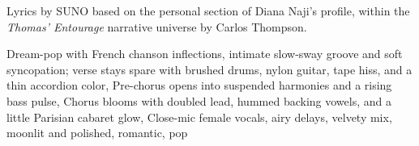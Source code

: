 
\begin{notes}
Lyrics by SUNO based on the personal section of Diana Naji's profile, within the \emph{Thomas’ Entourage} narrative universe by Carlos Thompson.
\end{notes}
\begin{style}
Dream-pop with French chanson inflections, intimate slow-sway groove and soft syncopation; verse stays spare with brushed drums, nylon guitar, tape hiss, and a thin accordion color, Pre-chorus opens into suspended harmonies and a rising bass pulse, Chorus blooms with doubled lead, hummed backing vowels, and a little Parisian cabaret glow, Close-mic female vocals, airy delays, velvety mix, moonlit and polished, romantic, pop
\end{style}

